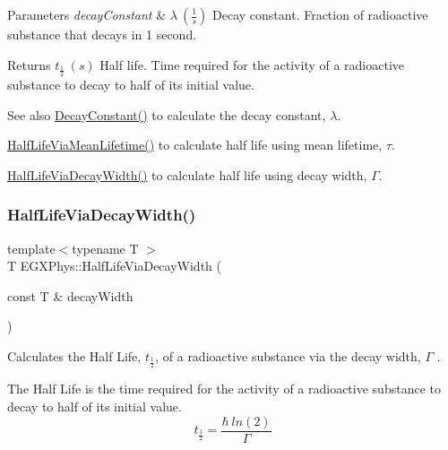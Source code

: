\begin{DoxyParams}{Parameters}
{\em decay\+Constant} & $\lambda\ (\frac{1}{s})$ Decay constant. Fraction of radioactive substance that decays in 1 second. \\
\hline
\end{DoxyParams}
\begin{DoxyReturn}{Returns}
$t_{\frac{1}{2}}\ (s)$ Half life. Time required for the activity of a radioactive substance to decay to half of its initial value. 
\end{DoxyReturn}
\begin{DoxySeeAlso}{See also}
\mbox{\hyperlink{group___e_g_x_phys-_decay_constant_ga904edce5aad441b4a0873b3b1a83c7f2}{Decay\+Constant()}} to calculate the decay constant, $\lambda$. 

\mbox{\hyperlink{group___e_g_x_phys-_half_life_gacddef16b62e98b214ec8dd8af7da7dce}{Half\+Life\+Via\+Mean\+Lifetime()}} to calculate half life using mean lifetime, $\tau$. 

\mbox{\hyperlink{group___e_g_x_phys-_half_life_gaba3fda944d1a68ee1016a1f2f5809359}{Half\+Life\+Via\+Decay\+Width()}} to calculate half life using decay width, $\Gamma$. 
\end{DoxySeeAlso}
\mbox{\label{group___e_g_x_phys-_half_life_gaba3fda944d1a68ee1016a1f2f5809359}} 
\subsubsection{\texorpdfstring{Half\+Life\+Via\+Decay\+Width()}{HalfLifeViaDecayWidth()}}
{\footnotesize\ttfamily template$<$typename T $>$ \\
T E\+G\+X\+Phys\+::\+Half\+Life\+Via\+Decay\+Width (\begin{DoxyParamCaption}\item[{const T \&}]{decay\+Width }\end{DoxyParamCaption})}



Calculates the Half Life, $t_{\frac{1}{2}}$, of a radioactive substance via the decay width, $\Gamma$ . 

The Half Life is the time required for the activity of a radioactive substance to decay to half of its initial value. \[t_{\frac{1}{2}}=\frac{\hbar \ ln(2)}{\Gamma}\]

